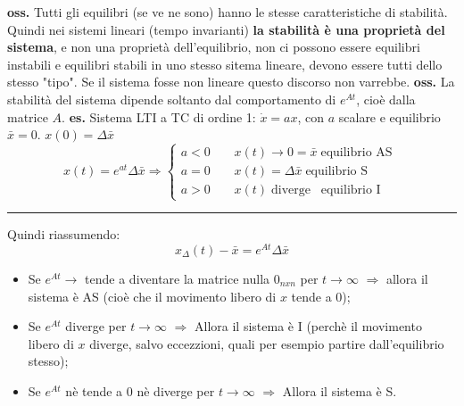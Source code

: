 \newline
\textbf{oss.}  Tutti gli equilibri (se ve ne sono) hanno le stesse caratteristiche di stabilità.\newline
Quindi nei sistemi lineari (tempo invarianti) \textbf{la stabilità è una proprietà del sistema}, e non una proprietà dell'equilibrio, non ci possono essere equilibri instabili e equilibri stabili in uno stesso sitema lineare, devono essere tutti dello stesso "tipo". Se il sistema fosse non lineare questo discorso non varrebbe.\newline
\newline
\textbf{oss.} La stabilità del sistema dipende soltanto dal comportamento di $e^{At}$, cioè dalla matrice $A$.\newline
\newline
\textbf{es.}  Sistema LTI a TC di ordine 1:\newline
$\dot{x} = a x$, con $a$ scalare e equilibrio $\bar{x} = 0$.\newline
$x(0) = \Delta \bar{x}$\newline
\[
    x(t) = e^{at} \Delta \bar{x}\Rightarrow \begin{cases}
        a < 0 \;\;\;\; & x(t) \rightarrow  0 = \bar{x} \;\text{equilibrio AS}\;\\
        a = 0 \;\;\;\; & x(t) = \Delta \bar{x} \;\text{equilibrio S}\;\\
        a > 0 \;\;\;\; & x(t) \;\text{diverge}\;\;\;\text{equilibrio I}\;
    \end{cases}
\]
\rule{\textwidth}{0,4pt}\newline
\newline
Quindi riassumendo:
\[
    x_{\Delta}(t) - \bar{x} = e^{At}\Delta \bar{x}
\]
\begin{itemize}
    \item Se $e^{At} \rightarrow$ tende a diventare la matrice nulla $0_{nxn}$ per $t \rightarrow  \infty$ $\Longrightarrow$ allora il sistema è AS (cioè che il movimento libero di $x$ tende a $0$);
    \item Se $e^{At}$ diverge per $t \rightarrow  \infty$ $\Longrightarrow$ Allora il sistema è I (perchè il movimento libero di $x$ diverge, salvo eccezzioni, quali per esempio partire dall'equilibrio stesso);
    \item Se $e^{At}$ nè tende a $0$ nè diverge per $t \rightarrow  \infty$ $\Longrightarrow$  Allora il sistema è S.
\end{itemize}
